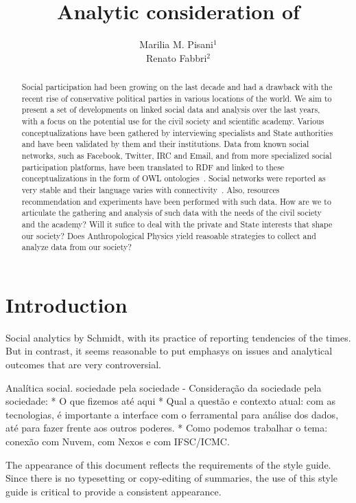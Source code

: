 \documentclass[letterpaper,10pt]{article}
\begin{document}
\title{Analytic consideration of }

\author{Marilia M. Pisani$^1$\\
Renato Fabbri$^2$}
\address{$^1$CCNH/UFABC, $^2$IFSC/USP}

\begin{abstract}
Social participation had been growing on the last decade
and had a drawback with the recent rise of conservative political parties 
in various locations of the world.
We aim to present a set of developments on linked social data
and analysis over the last years, with a focus
on the potential use for the civil society and scientific academy.
Various conceptualizations have been gathered by interviewing specialists
and State authorities and have been validated by them and their institutions.
Data from known social networks, such as Facebook, Twitter, IRC and Email,
and from more specialized social participation platforms, have been
	translated to RDF and linked to these conceptualizations in the form of OWL ontologies~\cite{losd,pnud5}.
Social networks were reported as very stable and their language varies
	with connectivity~\cite{tese,stab}.
	Also, resources recommendation and experiments have been performed with such data.
	How are we to articulate the gathering and analysis 
	of such data with the needs of the civil society and the academy?
	Will it sufice to deal with the private and State interests
	that shape our society?
	Does Anthropological Physics yield reasoable strategies
	to collect and analyze data from our society?
\end{abstract}

\section{Introduction}
Social analytics by Schmidt, with its practice of reporting tendencies of the times.
But in contrast, it seems reasonable to put emphasys on issues and analytical outcomes
that are very controversial.


Analítica social. sociedade pela sociedade 
  - Consideração da sociedade pela sociedade:
    * O que fizemos até aqui
    * Qual a questão e contexto atual: com as tecnologias,
    é importante a interface com o ferramental para análise dos dados,
    até para fazer frente aos outros poderes.
    * Como podemos trabalhar o tema: conexão com Nuvem, com Nexos e com IFSC/ICMC.

The appearance of this document reflects the requirements of the style guide.  Since there is no typesetting or copy-editing of summaries, the use of this style guide is critical to provide a consistent appearance.
\end{document}
